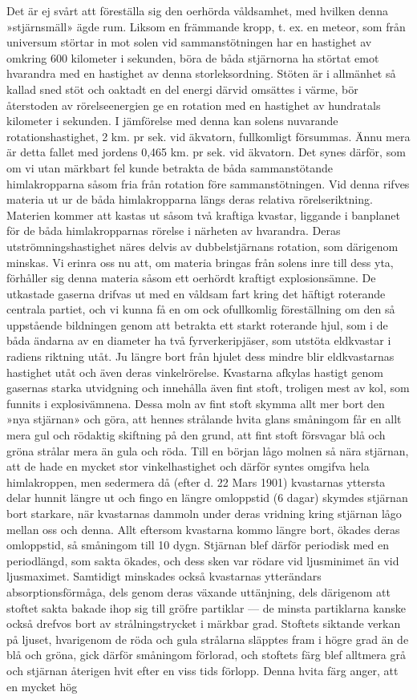 \documentclass[a4paper, 12pt, oneside, swedish]{article}
\begin{document}
Det är ej svårt att föreställa sig den oerhörda våldsamhet, med hvilken denna »stjärnsmäll» ägde rum. Liksom en främmande kropp, t. ex. en meteor, som från universum störtar in mot solen vid sammanstötningen har en hastighet av omkring 600 kilometer i sekunden, böra de båda stjärnorna ha störtat emot hvarandra med en hastighet av denna storleksordning. Stöten är i allmänhet så kallad sned stöt och oaktadt en del energi därvid omsättes i värme, bör återstoden av rörelseenergien ge en rotation med en hastighet av hundratals kilometer i sekunden. I jämförelse med denna kan solens nuvarande rotationshastighet, 2 km. pr sek. vid äkvatorn, fullkomligt försummas. Ännu mera är detta fallet med jordens 0,465 km. pr sek. vid äkvatorn. Det synes därför, som om vi utan märkbart fel kunde betrakta de båda sammanstötande himlakropparna såsom fria från rotation före sammanstötningen. Vid denna rifves materia ut ur de båda himlakropparna längs deras relativa rörelseriktning. Materien kommer att kastas ut såsom två kraftiga kvastar, liggande i banplanet för de båda himlakropparnas rörelse i närheten av hvarandra. Deras utströmningshastighet näres delvis av dubbelstjärnans rotation, som därigenom minskas. Vi erinra oss nu att, om materia bringas från solens inre till dess yta, förhåller sig denna materia såsom ett oerhördt kraftigt explosionsämne. De utkastade gaserna drifvas ut med en våldsam fart kring det häftigt roterande centrala partiet, och vi kunna få en om ock ofullkomlig föreställning om den så uppstående bildningen genom att betrakta ett starkt roterande hjul, som i de båda ändarna av en diameter ha två fyrverkeripjäser, som utstöta eldkvastar i radiens riktning utåt. Ju längre bort från hjulet dess mindre blir eldkvastarnas hastighet utåt och även deras vinkelrörelse. Kvastarna afkylas hastigt genom gasernas starka utvidgning och innehålla även fint stoft, troligen mest av kol, som funnits i explosivämnena. Dessa moln av fint stoft skymma allt mer bort den »nya stjärnan» och göra, att hennes strålande hvita glans småningom får en allt mera gul och rödaktig skiftning på den grund, att fint stoft försvagar blå och gröna strålar mera än gula och röda. Till en början lågo molnen så nära stjärnan, att de hade en mycket stor vinkelhastighet och därför syntes omgifva hela himlakroppen, men sedermera då (efter d. 22 Mars 1901) kvastarnas yttersta delar hunnit längre ut och fingo en längre omloppstid (6 dagar) skymdes stjärnan bort starkare, när kvastarnas dammoln under deras vridning kring stjärnan lågo mellan oss och denna. Allt eftersom kvastarna kommo längre bort, ökades deras omloppstid, så småningom till 10 dygn. Stjärnan blef därför periodisk med en periodlängd, som sakta ökades, och dess sken var rödare vid ljusminimet än vid ljusmaximet. Samtidigt minskades också kvastarnas ytterändars absorptionsförmåga, dels genom deras växande uttänjning, dels därigenom att stoftet sakta bakade ihop sig till gröfre partiklar --- de minsta partiklarna kanske också drefvos bort av strålningstrycket i märkbar grad. Stoftets siktande verkan på ljuset, hvarigenom de röda och gula strålarna släpptes fram i högre grad än de blå och gröna, gick därför småningom förlorad, och stoftets färg blef alltmera grå och stjärnan återigen hvit efter en viss tids förlopp. Denna hvita färg anger, att en mycket hög 
\end{document}
